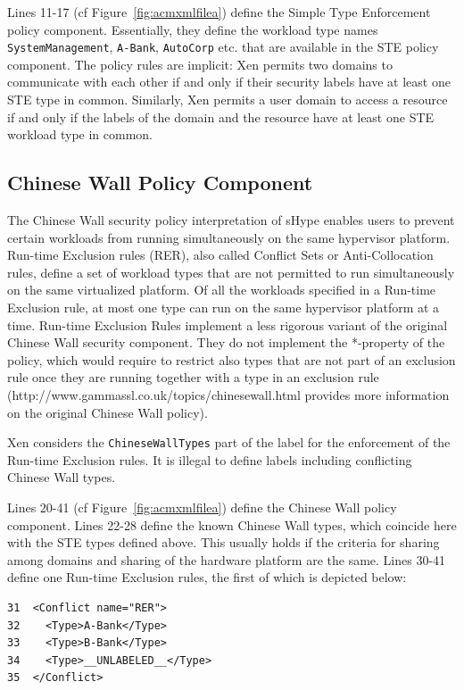 \documentclass[11pt,twoside,final,openright]{report}
\begin{document}
Lines 11-17 (cf Figure~\ref{fig:acmxmlfilea}) define the Simple Type
Enforcement policy component.  Essentially, they define the workload
type names \verb|SystemManagement|, \verb|A-Bank|,
\verb|AutoCorp| etc. that are available in the STE policy component. The
policy rules are implicit: Xen permits two domains to communicate with
each other if and only if their security labels have at least one STE type in
common.  Similarly, Xen permits a user domain to access a
resource if and only if the labels of the domain and the resource
have at least one STE workload type in common.

\subsection{Chinese Wall Policy Component}

The Chinese Wall security policy interpretation of sHype enables users
to prevent certain workloads from running simultaneously on the same
hypervisor platform.  Run-time Exclusion rules (RER), also called
Conflict Sets or Anti-Collocation rules, define a set of workload types
that are not permitted to run simultaneously on the same virtualized
platform. Of all the workloads specified in a Run-time
Exclusion rule, at most one type can run on the same hypervisor
platform at a time.  Run-time Exclusion Rules implement a less
rigorous variant of the original Chinese Wall security component. They
do not implement the *-property of the policy, which would require to
restrict also types that are not part of an exclusion rule once they
are running together with a type in an exclusion rule
(http://www.gammassl.co.uk/topics/chinesewall.html provides more information
on the original Chinese Wall policy).

Xen considers the \verb|ChineseWallTypes| part of the label for the
enforcement of the Run-time Exclusion rules.  It is illegal to define
labels including conflicting Chinese Wall types.

Lines 20-41 (cf Figure~\ref{fig:acmxmlfilea}) define the Chinese Wall
policy component. Lines 22-28 define the known Chinese Wall types,
which coincide here with the STE types defined above. This usually
holds if the criteria for sharing among domains and sharing of the
hardware platform are the same. Lines 30-41 define one Run-time
Exclusion rules, the first of which is depicted below:

\begin{scriptsize}
\begin{verbatim}
31  <Conflict name="RER">
32    <Type>A-Bank</Type>
33    <Type>B-Bank</Type>
34    <Type>__UNLABELED__</Type>
35  </Conflict>
\end{verbatim}
\end{scriptsize}
\end{document}

